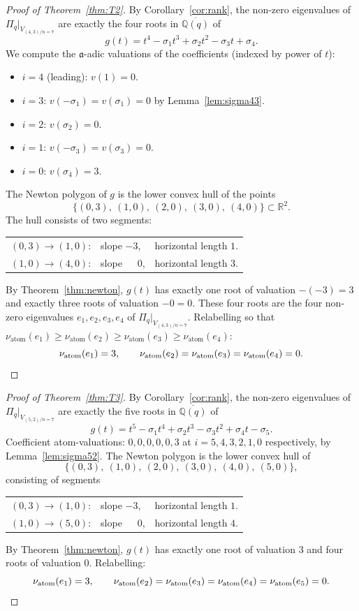 \documentclass[11pt]{article}
\theoremstyle{plain}
\theoremstyle{definition}
\theoremstyle{remark}
\newcommand{\Q}{\mathbb{Q}}
\newcommand{\Pibs}{\Pi_q}
\newcommand{\val}{\nu_{\mathrm{atom}}}
\newcommand{\atom}{\mathfrak{a}}
\begin{document}
\begin{proof}[Proof of Theorem~\ref{thm:T2}]
By Corollary~\ref{cor:rank}, the non-zero eigenvalues of $\Pibs|_{V_{(4,3)/n=7}}$ are
exactly the four roots in $\overline{\Q(q)}$ of
\[ g(t) = t^4 - \sigma_1 t^3 + \sigma_2 t^2 - \sigma_3 t + \sigma_4. \]
We compute the $\atom$-adic valuations of the coefficients (indexed by power of $t$):
\begin{itemize}
\item $i = 4$ (leading): $v(1) = 0$.
\item $i = 3$: $v(-\sigma_1) = v(\sigma_1) = 0$ by Lemma~\ref{lem:sigma43}.
\item $i = 2$: $v(\sigma_2) = 0$.
\item $i = 1$: $v(-\sigma_3) = v(\sigma_3) = 0$.
\item $i = 0$: $v(\sigma_4) = 3$.
\end{itemize}
The Newton polygon of $g$ is the lower convex hull of the points
\[ \big\{(0, 3),\ (1, 0),\ (2, 0),\ (3, 0),\ (4, 0)\big\} \subset \mathbb{R}^2. \]
The hull consists of two segments:
\begin{center}
\begin{tabular}{lll}
$(0,3) \to (1,0)$: & slope $-3$, & horizontal length $1$. \\
$(1,0) \to (4,0)$: & slope $\phantom{-}0$, & horizontal length $3$.
\end{tabular}
\end{center}
By Theorem~\ref{thm:newton}, $g(t)$ has exactly one root of valuation $-(-3)=3$ and
exactly three roots of valuation $-0 = 0$.  These four roots are the four non-zero
eigenvalues $e_1, e_2, e_3, e_4$ of $\Pibs|_{V_{(4,3)/n=7}}$.  Relabelling so that
$\val(e_1) \geq \val(e_2) \geq \val(e_3) \geq \val(e_4)$:
\[ \val(e_1) = 3, \qquad \val(e_2) = \val(e_3) = \val(e_4) = 0. \qedhere \]
\end{proof}

\begin{proof}[Proof of Theorem~\ref{thm:T3}]
By Corollary~\ref{cor:rank}, the non-zero eigenvalues of $\Pibs|_{V_{(5,2)/n=7}}$ are
exactly the five roots in $\overline{\Q(q)}$ of
\[ g(t) = t^5 - \sigma_1 t^4 + \sigma_2 t^3 - \sigma_3 t^2 + \sigma_4 t - \sigma_5. \]
Coefficient atom-valuations: $0, 0, 0, 0, 0, 3$ at $i = 5, 4, 3, 2, 1, 0$
respectively, by Lemma~\ref{lem:sigma52}.  The Newton polygon is the lower convex hull of
\[ \big\{(0, 3),\ (1, 0),\ (2, 0),\ (3, 0),\ (4, 0),\ (5, 0)\big\}, \]
consisting of segments
\begin{center}
\begin{tabular}{lll}
$(0,3) \to (1,0)$: & slope $-3$, & horizontal length $1$. \\
$(1,0) \to (5,0)$: & slope $\phantom{-}0$, & horizontal length $4$.
\end{tabular}
\end{center}
By Theorem~\ref{thm:newton}, $g(t)$ has exactly one root of valuation $3$ and four
roots of valuation $0$.  Relabelling:
\[ \val(e_1) = 3, \qquad \val(e_2) = \val(e_3) = \val(e_4) = \val(e_5) = 0. \qedhere \]
\end{proof}
\end{document}
